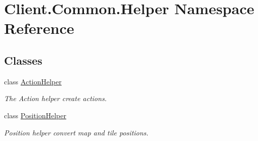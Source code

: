 \hypertarget{namespaceClient_1_1Common_1_1Helper}{}\section{Client.\+Common.\+Helper Namespace Reference}
\label{namespaceClient_1_1Common_1_1Helper}
\subsection*{Classes}
\begin{DoxyCompactItemize}
\item 
class \hyperlink{classClient_1_1Common_1_1Helper_1_1ActionHelper}{Action\+Helper}
\begin{DoxyCompactList}\small\item\em The Action helper create actions. \end{DoxyCompactList}\item 
class \hyperlink{classClient_1_1Common_1_1Helper_1_1PositionHelper}{Position\+Helper}
\begin{DoxyCompactList}\small\item\em Position helper convert map and tile positions. \end{DoxyCompactList}\end{DoxyCompactItemize}
